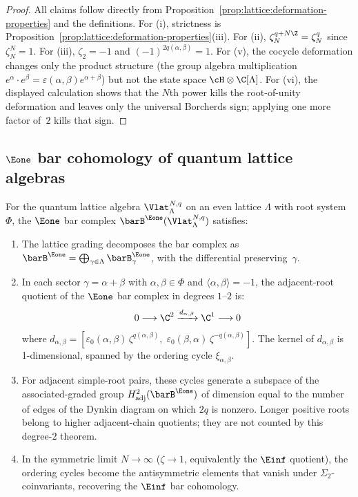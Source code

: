 \begin{proof}
All claims follow directly from
Proposition~\ref{prop:lattice:deformation-properties} and the
definitions. For (i), strictness is
Proposition~\ref{prop:lattice:deformation-properties}(iii).
For (ii), $\zeta_N^{q + N\Z} = \zeta_N^q$ since
$\zeta_N^N = 1$. For (iii), $\zeta_2 = -1$ and
$(-1)^{2q(\alpha,\beta)} = 1$. For (v), the cocycle deformation
changes only the product structure (the group algebra multiplication
$e^\alpha \cdot e^\beta = \varepsilon(\alpha,\beta) e^{\alpha+\beta}$)
but not the state space $\cH \otimes \C[\Lambda]$.
For (vi), the displayed calculation shows that the $N$th power kills
the root-of-unity deformation and leaves only the universal
Borcherds sign; applying one more factor of~$2$ kills that sign.
\end{proof}


\subsection{$\Eone$ bar cohomology of quantum lattice algebras}

\begin{theorem}
\label{thm:lattice:e1-bar-cohomology}
For the quantum lattice algebra $\Vlat_\Lambda^{N,q}$ on an even
lattice $\Lambda$ with root system~$\Phi$, the $\Eone$ bar complex
$\barB^{\Eone}(\Vlat_\Lambda^{N,q})$ satisfies:
\begin{enumerate}[label=(\roman*)]
\item The lattice grading decomposes the bar complex as
 $\barB^{\Eone} = \bigoplus_{\gamma \in \Lambda}
 \barB^{\Eone}_\gamma$, with the differential
 preserving~$\gamma$.
\item In each sector $\gamma = \alpha + \beta$ with
 $\alpha, \beta \in \Phi$ and $\langle\alpha,\beta\rangle = -1$,
 the adjacent-root quotient of the $\Eone$ bar complex in degrees
 $1$--$2$ is:
 \[
 0 \longrightarrow \C^2
 \xrightarrow{d_{\alpha,\beta}}
 \C^1 \longrightarrow 0
 \]
 where $d_{\alpha,\beta}
 = [\varepsilon_0(\alpha,\beta)\,\zeta^{q(\alpha,\beta)},\;
 \varepsilon_0(\beta,\alpha)\,\zeta^{-q(\alpha,\beta)}]$.
 The kernel of $d_{\alpha,\beta}$ is 1-dimensional, spanned by the
 ordering cycle $\xi_{\alpha,\beta}$.
\item For adjacent simple-root pairs, these cycles generate a
subspace of the associated-graded group
$H^2_{\mathrm{adj}}(\barB^{\Eone})$ of dimension equal to the number
of edges of the Dynkin diagram on which $2q$ is nonzero. Longer
positive roots belong to higher adjacent-chain quotients; they are not
counted by this degree-$2$ theorem.
\item In the symmetric limit $N \to \infty$ \textup{(}$\zeta \to 1$,
 equivalently the $\Einf$ quotient\textup{)}, the ordering cycles
 become the antisymmetric elements that vanish under
 $\Sigma_2$-coinvariants, recovering the $\Einf$ bar cohomology.
\end{enumerate}
\end{theorem}

